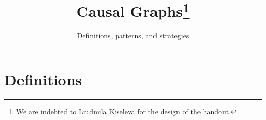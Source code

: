 
\usepackage{subfig}
\usepackage{graphicx}
\newcommand\sbullet[1][.5]{\mathbin{\vcenter{\hbox{\scalebox{#1}{$\bullet$}}}}}
\usepackage[export]{adjustbox}


\title{Causal Graphs\thanks{We are indebted to Liudmila Kiseleva for the design of the handout.}}
\subtitle{Definitions, patterns, and strategies}
\date{}

\maketitle\vspace{-2cm}

\section*{Definitions}

